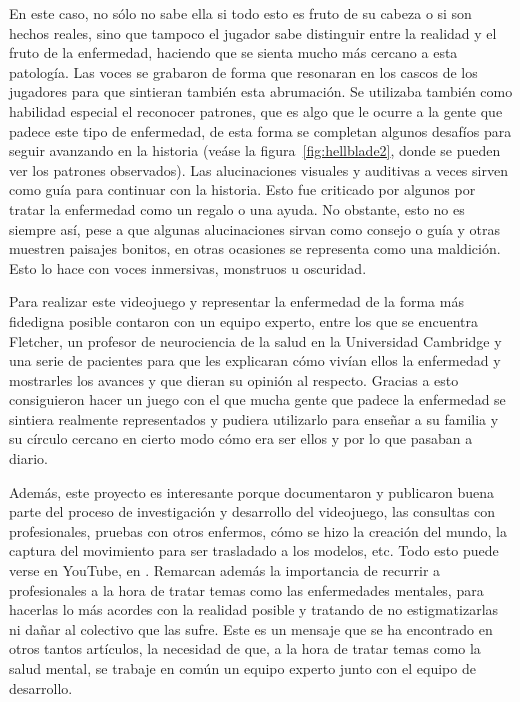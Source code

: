 \documentclass[12pt, a4paper,twoside,titlepage]{book}
\begin{document}
En este caso, no sólo no sabe ella si todo esto es fruto de su cabeza o si son hechos reales, sino que tampoco el jugador sabe distinguir entre la realidad y el fruto de la enfermedad, haciendo que se sienta mucho más cercano a esta patología. Las voces se grabaron de forma que resonaran en los cascos de los jugadores para que sintieran también esta abrumación. Se utilizaba también como habilidad especial el reconocer patrones, que es algo que le ocurre a la gente que padece este tipo de enfermedad, de esta forma se completan algunos desafíos para seguir avanzando en la historia (veáse la figura~\ref{fig:hellblade2}, donde se pueden ver los patrones observados). Las alucinaciones visuales y auditivas a veces sirven como guía para continuar con la historia. Esto fue criticado por algunos por tratar la enfermedad como un regalo o una ayuda. No obstante, esto no es siempre así, pese a que algunas alucinaciones sirvan como consejo o guía y otras muestren paisajes bonitos, en otras ocasiones se representa como una maldición. Esto lo hace con voces inmersivas, monstruos u oscuridad. 

Para realizar este videojuego y representar la enfermedad de la forma más fidedigna posible contaron con un equipo experto, entre los que se encuentra Fletcher, un profesor de neurociencia de la salud en la Universidad Cambridge y una serie de pacientes para que les explicaran cómo vivían ellos la enfermedad y mostrarles los avances y que dieran su opinión al respecto. Gracias a esto consiguieron hacer un juego con el que mucha gente que padece la enfermedad se sintiera realmente representados y pudiera utilizarlo para enseñar a su familia y su círculo cercano en cierto modo cómo era ser ellos y por lo que pasaban a diario. 

Además, este proyecto es interesante porque documentaron y publicaron buena parte del proceso de investigación y desarrollo del videojuego, las consultas con profesionales, pruebas con otros enfermos, cómo se hizo la creación del mundo, la captura del movimiento para ser trasladado a los modelos, etc. Todo esto puede verse en YouTube, en . Remarcan además la importancia de recurrir a profesionales a la hora de tratar temas como las enfermedades mentales, para hacerlas lo más acordes con la realidad posible y tratando de no estigmatizarlas ni dañar al colectivo que las sufre. Este es un mensaje que se ha encontrado en otros tantos artículos, la necesidad de que, a la hora de tratar temas como la salud mental, se trabaje en común un equipo experto junto con el equipo de desarrollo.
\end{document}
